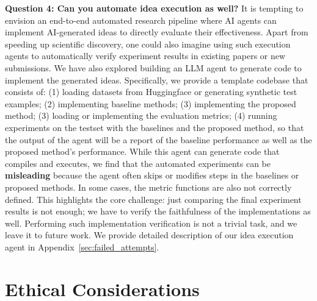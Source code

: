 \textbf{Question 4: Can you automate idea execution as well?}
It is tempting to envision an end-to-end automated research pipeline where AI agents can implement AI-generated ideas to directly evaluate their effectiveness. 
Apart from speeding up scientific discovery, one could also imagine using such execution agents to automatically verify experiment results in existing papers or new submissions. 
We have also explored building an LLM agent to generate code to implement the generated ideas. 
Specifically, we provide a template codebase that consists of: (1) loading datasets from Huggingface or generating synthetic test examples; (2) implementing baseline methods; (3) implementing the proposed method; (3) loading or implementing the evaluation metrics; (4) running experiments on the testset with the baselines and the proposed method, so that
the output of the agent will be a report of the baseline performance as well as the proposed method's performance. 
While this agent can generate code that compiles and executes, we find that the automated experiments can be \textbf{misleading} because the agent often skips or modifies steps in the baselines or proposed methods. In some cases, the metric functions are also not correctly defined. 
This highlights the core challenge: just comparing the final experiment results is not enough; we have to verify the faithfulness of the implementations as well. 
Performing such implementation verification is not a trivial task, and we leave it to future work. 
We provide detailed description of our idea execution agent in Appendix~\ref{sec:failed_attempts}. 








\section{Ethical Considerations}
\label{sec:ethics}


